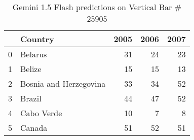 \begin{table}
    \begin{tabular}{llrrr}
\toprule
 & Country & 2005 & 2006 & 2007 \\
\midrule
0 & Belarus & 31 & 24 & 23 \\
1 & Belize & 15 & 15 & 13 \\
2 & Bosnia and Herzegovina & 33 & 34 & 52 \\
3 & Brazil & 44 & 47 & 52 \\
4 & Cabo Verde & 10 & 7 & 8 \\
5 & Canada & 51 & 52 & 51 \\
\bottomrule
\end{tabular}
    \caption{Gemini 1.5 Flash predictions on Vertical Bar \# 25905}
    \label{tab:gemini-plotqa-vbar-25905}
\end{table}
